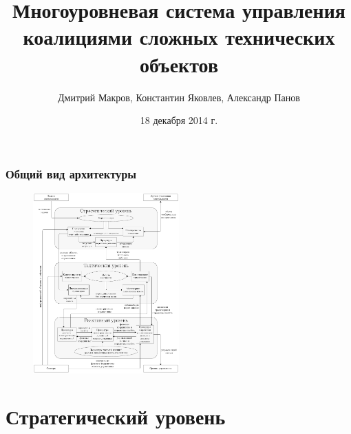 \documentclass[default]{beamer}
\begin{document}
	
	\title[Многоуровневая система управления]{Многоуровневая система управления коалициями сложных технических объектов}
	\author[Макаров, Яковлев, Панов]{Дмитрий Макров, Константин Яковлев, Александр Панов}
	\date{18 декабря 2014 г.} 

	\begin{frame}
		\titlepage
	\end{frame}

	\begin{frame}
		\frametitle{Общий вид архитектуры}
		\begin{figure}
			\includegraphics[width=0.5\textwidth]{../architecture}
		\end{figure}
	\end{frame}

	\section{Стратегический уровень}
		
\end{document}
